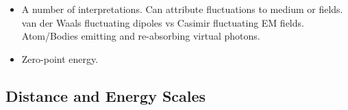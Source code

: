\begin{itemize}
  \item A number of interpretations.  Can attribute fluctuations to medium or fields.  
    van der Waals fluctuating dipoles vs Casimir fluctuating EM fields.  
    Atom/Bodies emitting and re-absorbing virtual photons.  
  \item Zero-point energy.  
\end{itemize}

\subsection{Distance and Energy Scales}

